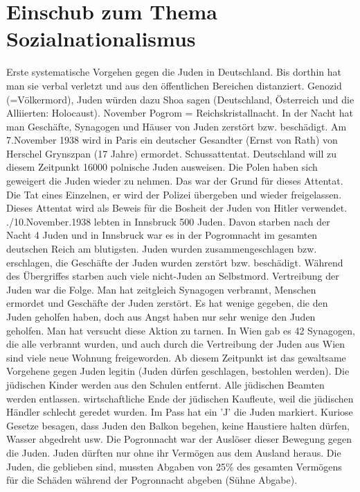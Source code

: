 \documentclass[a4paper,final]{report}
\begin{document}
\chapter{Einschub zum Thema Sozialnationalismus}

Erste systematische Vorgehen gegen die Juden in Deutschland. Bis dorthin hat man sie verbal verletzt und aus den öffentlichen Bereichen distanziert.  Genozid (=Völkermord), Juden würden dazu Shoa sagen (Deutschland, Österreich und die Alliierten: Holocaust). November Pogrom = Reichskristallnacht. In der Nacht hat man Geschäfte, Synagogen und Häuser von Juden zerstört bzw. beschädigt. 
\newline
\newline
Am 7.November 1938 wird in Paris ein deutscher Gesandter (Ernst von Rath) von Herschel Grynszpan (17 Jahre) ermordet. Schussattentat. Deutschland will zu diesem Zeitpunkt 16000 polnische Juden ausweisen. Die Polen haben sich geweigert die Juden wieder zu nehmen. Das war der Grund für dieses Attentat. Die Tat eines Einzelnen, er wird der Polizei übergeben und wieder freigelassen. Dieses Attentat wird als Beweis für die Bosheit der Juden von Hitler verwendet.
\newline
{}./10.November.1938 lebten in Innsbruck 500 Juden. Davon starben nach der Nacht 4 Juden und in Innsbruck war es in der Pogromnacht im gesamten deutschen Reich am blutigsten. Juden wurden zusammengeschlagen bzw. erschlagen, die Geschäfte der Juden wurden zerstört bzw. beschädigt. Während des Übergriffes starben auch viele nicht-Juden an Selbstmord. Vertreibung der Juden war die Folge.
\newline
\newline
Man hat zeitgleich Synagogen verbrannt, Menschen ermordet und Geschäfte der Juden zerstört. Es hat wenige gegeben, die den Juden geholfen haben, doch aus Angst haben nur sehr wenige den Juden geholfen. Man hat versucht diese Aktion zu tarnen.
\newline
\newline
In Wien gab es 42 Synagogen, die alle verbrannt wurden, und auch durch die Vertreibung der Juden aus Wien sind viele neue Wohnung freigeworden.
\newline
\newline
Ab diesem Zeitpunkt ist das gewaltsame Vorgehene gegen Juden legitin (Juden dürfen geschlagen, bestohlen werden). Die jüdischen Kinder werden aus den Schulen entfernt. Alle jüdischen Beamten werden entlassen. wirtschaftliche Ende der jüdischen Kaufleute, weil die jüdischen Händler schlecht geredet wurden. Im Pass hat ein 'J' die Juden markiert. Kuriose Gesetze besagen, dass Juden den Balkon begehen, keine Haustiere halten dürfen, Wasser abgedreht usw. Die Pogronnacht war der Auslöser dieser Bewegung gegen die Juden. Juden dürften nur ohne ihr Vermögen aus dem Ausland heraus. Die Juden, die geblieben sind, mussten Abgaben von 25\% des gesamten Vermögens für die Schäden während der Pogronnacht abgeben (Sühne Abgabe).
\end{document}
